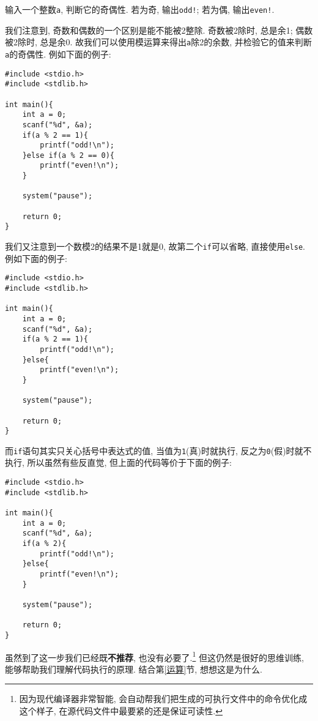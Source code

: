         输入一个整数\texttt{a}, 判断它的奇偶性. 若为奇, 输出\texttt{odd!}; 若为偶, 输出\texttt{even!}.

        我们注意到, 奇数和偶数的一个区别是能不能被2整除. 奇数被2除时, 总是余1; 偶数被2除时, 总是余0. 故我们可以使用模运算来得出\texttt{a}除2的余数, 并检验它的值来判断\texttt{a}的奇偶性. 例如下面的例子:
\begin{lstlisting}
#include <stdio.h>
#include <stdlib.h>

int main(){
    int a = 0;
    scanf("%d", &a);
    if(a % 2 == 1){
        printf("odd!\n");
    }else if(a % 2 == 0){
        printf("even!\n");
    }
    
    system("pause");

    return 0;
}
\end{lstlisting}

        我们又注意到一个数模2的结果不是1就是0, 故第二个\texttt{if}可以省略, 直接使用\texttt{else}. 例如下面的例子:
\begin{lstlisting}
#include <stdio.h>
#include <stdlib.h>

int main(){
    int a = 0;
    scanf("%d", &a);
    if(a % 2 == 1){
        printf("odd!\n");
    }else{
        printf("even!\n");
    }
    
    system("pause");

    return 0;
}
\end{lstlisting}

        而\texttt{if}语句其实只关心括号中表达式的值, 当值为\texttt{1}(真)时就执行, 反之为\texttt{0}(假)时就不执行, 所以虽然有些反直觉, 但上面的代码等价于下面的例子:
\begin{lstlisting}
#include <stdio.h>
#include <stdlib.h>

int main(){
    int a = 0;
    scanf("%d", &a);
    if(a % 2){
        printf("odd!\n");
    }else{
        printf("even!\n");
    }
    
    system("pause");

    return 0;
}
\end{lstlisting}

        虽然到了这一步我们已经既\textbf{不推荐}, 也没有必要了.\footnote{因为现代编译器非常智能, 会自动帮我们把生成的可执行文件中的命令优化成这个样子, 在源代码文件中最要紧的还是保证可读性.} 但这仍然是很好的思维训练, 能够帮助我们理解代码执行的原理. 结合第\ref{运算}节, 想想这是为什么.

